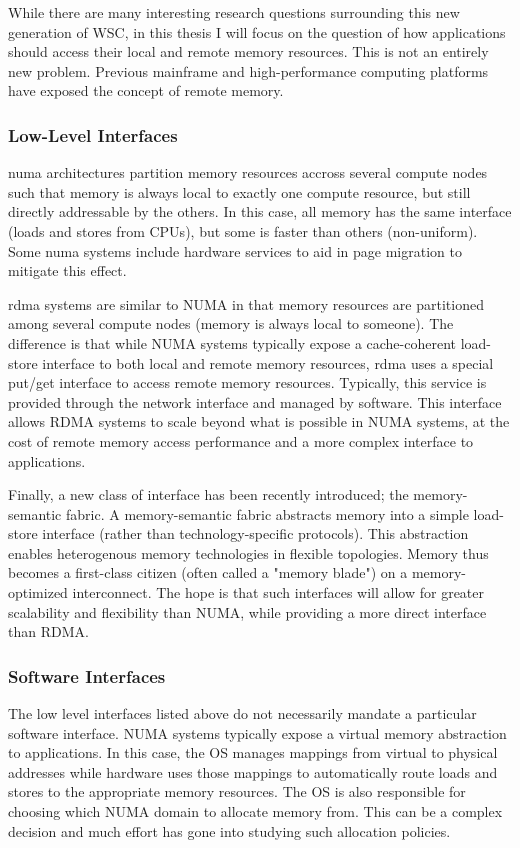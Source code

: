 While there are many interesting research questions surrounding this new
generation of WSC, in this thesis I will focus on the question of how
applications should access their local and remote memory resources. This is not
an entirely new problem. Previous mainframe and high-performance computing
platforms have exposed the concept of remote memory. 

\subsubsection{Low-Level Interfaces}
\Gls{numa} architectures partition memory resources
accross several compute nodes such that memory is always local to exactly one
compute resource, but still directly addressable by the others. In this case,
all memory has the same interface (loads and stores from CPUs), but some is
faster than others (non-uniform). Some \gls{numa} systems include hardware services
to aid in page migration to mitigate this effect\cite{sgi_origin}.

\gls{rdma} systems are similar to NUMA in that memory
resources are partitioned among several compute nodes (memory is always local
to someone)\cite{RoCE}\cite{RFC5040}. The difference is that while NUMA systems typically expose a
cache-coherent load-store interface to both local and remote memory resources,
\gls{rdma} uses a special put/get interface to access remote memory resources.
Typically, this service is provided through the network interface and managed
by software. This interface allows RDMA systems to scale beyond what is
possible in NUMA systems, at the cost of remote memory access performance and a
more complex interface to applications.

Finally, a new class of interface has been recently introduced; the
memory-semantic fabric. A memory-semantic fabric abstracts memory into a simple
load-store interface (rather than technology-specific protocols). This
abstraction enables heterogenous memory technologies in flexible topologies.
Memory thus becomes a first-class citizen (often called a "memory blade") on a
memory-optimized interconnect. The hope is that such interfaces will allow for
greater scalability and flexibility than NUMA, while providing a more direct
interface than RDMA\cite{genz}\cite{sonuma}. 

\subsubsection{Software Interfaces}
The low level interfaces listed above do not necessarily mandate a particular
software interface. NUMA systems typically expose a virtual memory abstraction
to applications. In this case, the OS manages mappings from virtual to physical
addresses while hardware uses those mappings to automatically route loads and
stores to the appropriate memory resources. The OS is also responsible for choosing which NUMA domain to
allocate memory from. This can be a complex decision and much effort has gone
into studying such allocation policies\cite{linux_numa}.

